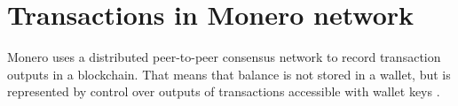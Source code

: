 \documentclass[
  printed, %
  table,   %
  nolof,     %
  nolot,     %
           oneside, color
]{fithesis3}
\begin{document}
\section{Transactions in Monero network}
Monero uses a distributed peer-to-peer consensus network to record transaction outputs in a blockchain. That means that balance is not stored in a wallet, but is represented by control over outputs of transactions accessible with wallet keys \cite{seguias2018moneroa}.
\end{document}
